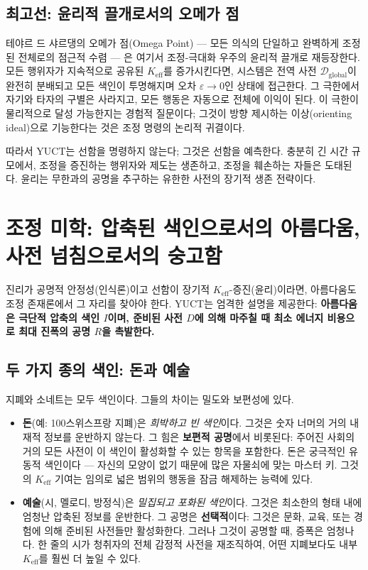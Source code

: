 \documentclass[12pt,a4paper]{article}
\newcommand{\Keff}{K_{\mathrm{eff}}}
\begin{document}
	\subsection{최고선: 윤리적 끌개로서의 오메가 점}
	
	테야르 드 샤르댕의 오메가 점(Omega Point) — 모든 의식의 단일하고 완벽하게 조정된 전체로의 점근적 수렴 — 은 여기서 조정-극대화 우주의 윤리적 끌개로 재등장한다. 모든 행위자가 지속적으로 공유된 \(\Keff\)를 증가시킨다면, 시스템은 전역 사전 \(\mathcal{D}_{\text{global}}\)이 완전히 분배되고 모든 색인이 투명해지며 오차 \(\varepsilon \to 0\)인 상태에 접근한다. 그 극한에서 자기와 타자의 구별은 사라지고, 모든 행동은 자동으로 전체에 이익이 된다. 이 극한이 물리적으로 달성 가능한지는 경험적 질문이다; 그것이 방향 제시하는 이상(orienting ideal)으로 기능한다는 것은 조정 명령의 논리적 귀결이다.
	
	따라서 YUCT는 선함을 명령하지 않는다; 그것은 선함을 예측한다. 충분히 긴 시간 규모에서, 조정을 증진하는 행위자와 제도는 생존하고, 조정을 훼손하는 자들은 도태된다. 윤리는 무한과의 공명을 추구하는 유한한 사전의 장기적 생존 전략이다.
	
	\section{조정 미학: 압축된 색인으로서의 아름다움, 사전 넘침으로서의 숭고함}
	\label{sec:coordination-aesthetics}
	
	진리가 공명적 안정성(인식론)이고 선함이 장기적 \(K_{\mathrm{eff}}\)-증진(윤리)이라면, 아름다움도 조정 존재론에서 그 자리를 찾아야 한다. YUCT는 엄격한 설명을 제공한다: \textbf{아름다움은 극단적 압축의 색인 \(I\)이며, 준비된 사전 \(D\)에 의해 마주칠 때 최소 에너지 비용으로 최대 진폭의 공명 \(R\)을 촉발한다.}
	
	\subsection{두 가지 종의 색인: 돈과 예술}
	
	지폐와 소네트는 모두 색인이다. 그들의 차이는 밀도와 보편성에 있다.
	
	\begin{itemize}[leftmargin=*]
		\item \textbf{돈}(예: 100스위스프랑 지폐)은 \emph{희박하고 빈 색인}이다. 그것은 숫자 너머의 거의 내재적 정보를 운반하지 않는다. 그 힘은 \textbf{보편적 공명}에서 비롯된다: 주어진 사회의 거의 모든 사전이 이 색인이 활성화할 수 있는 항목을 포함한다. 돈은 궁극적인 유동적 색인이다 — 자신의 모양이 없기 때문에 많은 자물쇠에 맞는 마스터 키. 그것의 \(K_{\mathrm{eff}}\) 기여는 임의로 넓은 범위의 행동을 잠금 해제하는 능력에 있다.
		\item \textbf{예술}(시, 멜로디, 방정식)은 \emph{밀집되고 포화된 색인}이다. 그것은 최소한의 형태 내에 엄청난 압축된 정보를 운반한다. 그 공명은 \textbf{선택적}이다: 그것은 문화, 교육, 또는 경험에 의해 준비된 사전들만 활성화한다. 그러나 그것이 공명할 때, 증폭은 엄청나다. 한 줄의 시가 청취자의 전체 감정적 사전을 재조직하여, 어떤 지폐보다도 내부 \(K_{\mathrm{eff}}\)를 훨씬 더 높일 수 있다.
	\end{itemize}
	
\end{document}
